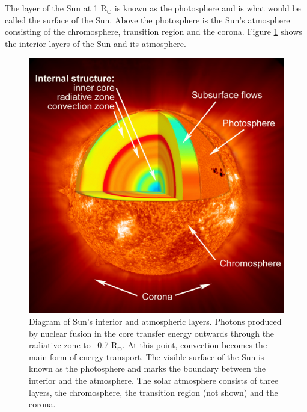 The layer of the Sun at 1 R$_{\odot}$ is known as the photosphere and is what would be called the surface of the Sun.
Above the photosphere is the Sun's atmosphere consisting of the chromosphere, transition region and the corona. Figure \ref{fig:Sun} shows the interior layers of the Sun and its atmosphere.
\begin{figure}[t]
    \centering
    \includegraphics[width=0.5\columnwidth]{Images/Sun_interior.jpg}
    \caption[Diagram of Sun's interior and atmospheric layers.]{Diagram of Sun's interior and atmospheric layers. Photons produced by nuclear fusion in the core transfer energy outwards through the radiative zone to ~0.7 R$_{\odot}$. At this point, convection becomes the main form of energy transport. The visible surface of the Sun is known as the photosphere and marks the boundary between the interior and the atmosphere. The solar atmosphere consists of three layers, the chromosphere, the transition region (not shown) and the corona.}
    \label{fig:Sun}
\end{figure}

